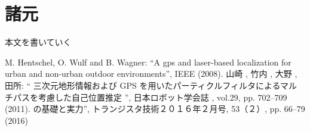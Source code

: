 \documentclass[a4jsme]{jsmepaper}
\begin{document}
\maketitle
\thispagestyle{fancy}
\small



\section{諸元}
本文を書いていく


\scriptsize
\begin{thebibliography}{9}
   M. Hentschel, O. Wulf and B. Wagner: “A gps and laser-based localization for urban and
non-urban outdoor environments”, IEEE (2008).
   山崎 , 竹内 , 大野 , 田所: “ 三次元地形情報および GPS を用いたパーティクルフィルタによるマル
チパスを考慮した自己位置推定 ”, 日本ロボット学会誌 , vol.29, pp. 702–709 (2011).
の基礎と実力”, トランジスタ技術２０１６年２月号, 53（２）, pp. 66–79 (2016)
\end{thebibliography}
\small
\end{document}
